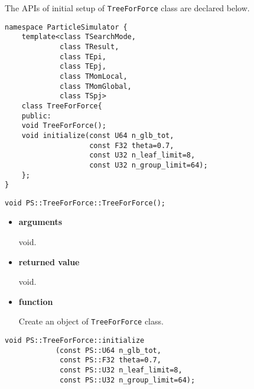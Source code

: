 The APIs of initial setup of {\tt TreeForForce} class are declared
below.

\begin{lstlisting}[caption=TreeForForce1]
namespace ParticleSimulator {
    template<class TSearchMode,
             class TResult,
             class TEpi,
             class TEpj,
             class TMomLocal,
             class TMomGlobal,
             class TSpj>
    class TreeForForce{
    public:
    void TreeForForce();
    void initialize(const U64 n_glb_tot,
                    const F32 theta=0.7,
                    const U32 n_leaf_limit=8,
                    const U32 n_group_limit=64);
    };
}
\end{lstlisting}


\begin{screen}
\begin{verbatim}
void PS::TreeForForce::TreeForForce();
\end{verbatim}
\end{screen}

\begin{itemize}

\item {\bf arguments}

void.

\item {\bf returned value}

void.

\item {\bf function}

Create an object of {\tt TreeForForce} class.

\end{itemize}


\begin{screen}
\begin{verbatim}
void PS::TreeForForce::initialize
            (const PS::U64 n_glb_tot,
             const PS::F32 theta=0.7,
             const PS::U32 n_leaf_limit=8,
             const PS::U32 n_group_limit=64);
\end{verbatim}
\end{screen}

